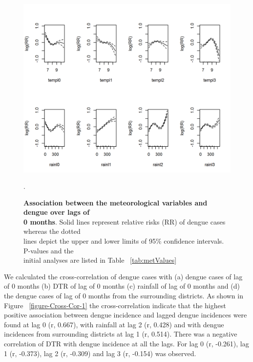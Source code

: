 \documentclass{bmcart}
\begin{document}
\begin{figure}[htbp]
	\begin{center}
		\includegraphics[width= 1.0\textwidth]{6-DM1}
		\caption{\textbf{Association between the meteorological variables and dengue over lags of \\ 0 months}. Solid lines represent relative risks (RR) of dengue cases whereas the dotted \\ lines depict the upper and lower limits of 95\%  confidence intervals. P-values and the \\ initial analyses are listed in Table ~\ref{tab:metValues}}
		\label{figure:D-M-1}.
	\end{center}
\end{figure}








We calculated the cross-correlation of dengue cases with (a) dengue cases of lag of 0 months (b) DTR of lag of 0 months (c) rainfall of lag of 0 months and (d) the dengue cases of lag of 0 months from the surrounding districts.  
As shown in Figure ~\ref{figure-Cross-Cor-1} the cross-correlation indicate that the highest positive association between dengue incidence and lagged dengue incidences were found at lag 0 (r, 0.667), with rainfall at lag 2 (r, 0.428) and with dengue incidences from surrounding districts at lag 1 (r, 0.514). There was a negative correlation of DTR with dengue incidence at all the lags. For lag 0 (r, -0.261), lag 1 (r, -0.373), lag 2 (r,  -0.309) and lag 3 (r,  -0.154) was observed. 
\end{document}
